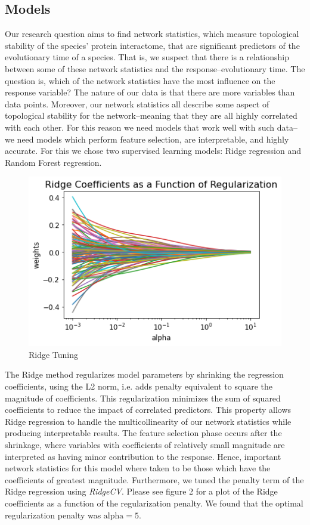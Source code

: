 \documentclass[12pt]{article}
\begin{document}
\subsection{Models}
Our research question aims to find network statistics, which measure topological stability of the species’ protein interactome, that are significant predictors of the evolutionary time of a species. That is, we suspect that there is a relationship between some of these network statistics and the response--evolutionary time. The question is, which of the network statistics have the most influence on the response variable? The nature of our data is that there are more variables than data points. Moreover, our network statistics all describe some aspect of topological stability for the network--meaning that they are all highly correlated with each other. For this reason we need models that work well with such data--we need models which perform feature selection, are interpretable, and highly accurate. For this we chose two supervised learning models: Ridge regression and Random Forest regression. 

\begin{figure}
\centering
  \includegraphics[width=.5\linewidth]{PPIN_fig4}
  \caption{Ridge Tuning}
  \label{fig:PPIN_fig4}
\end{figure}

The Ridge method regularizes model parameters by shrinking the regression coefficients, using the L2 norm, i.e. adds penalty equivalent to square the magnitude of coefficients. This regularization minimizes the sum of squared coefficients to reduce the impact of correlated predictors. This property allows Ridge regression to handle the multicollinearity of our network statistics while producing interpretable results. The feature selection phase occurs after the shrinkage, where variables with coefficients of relatively small magnitude are interpreted as having minor contribution to the response. Hence, important network statistics for this model where taken to be those which have the coefficients of greatest magnitude. Furthermore, we tuned the penalty term of the Ridge regression using \textit{RidgeCV}. Please see figure 2 for a plot of the Ridge coefficients as a function of the regularization penalty. We found that the optimal regularization penalty was $\text{alpha} = 5$. 
\end{document}
